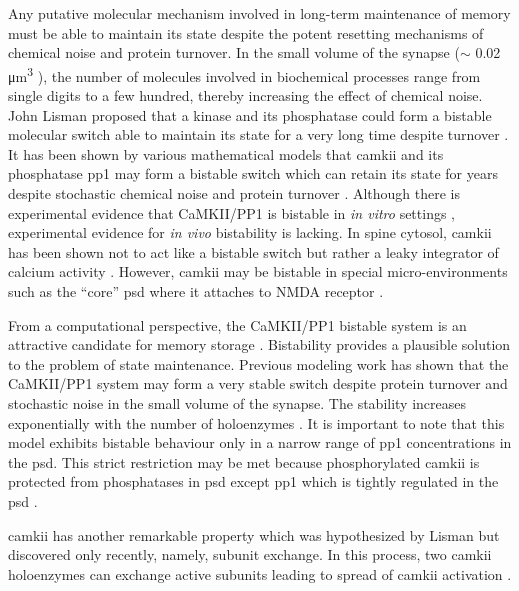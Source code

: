 \documentclass[9pt,lineno,doublespacing]{elife}
\begin{document}
Any putative molecular mechanism involved in long-term maintenance of memory
must be able to maintain its state despite the potent resetting mechanisms of
chemical noise and protein turnover. In the small volume of the synapse ($\sim$
0.02 \si{\micro\meter^3} \citep{bartol_nanoconnectomic_2015}), the number of
molecules involved in biochemical processes range from single digits to a few
hundred, thereby increasing the effect of chemical noise. John Lisman proposed that
a kinase and its phosphatase could form a bistable molecular switch able to
maintain its state for a very long time despite turnover
\citep{lisman_mechanism_1985}. It has been shown by various mathematical models
that \gls{camkii} and its phosphatase \gls{pp1} may form a bistable switch
\citep{zhabotinsky_bistability_2000} which can retain its state for years
despite stochastic chemical noise and protein turnover
\citep{miller_stability_2005}. Although there is experimental evidence that
CaMKII/PP1 is bistable in \emph{in vitro} settings
\citep{bradshaw_ultrasensitive_2003,urakubo_vitro_2014}, experimental evidence
for \emph{in vivo} bistability is lacking. In spine cytosol, \gls{camkii} has
been shown not to act like a bistable switch but rather a leaky integrator of
calcium activity \citep{chang_camkii_2017}. However, \gls{camkii} may be
bistable in special micro-environments such as the ``core'' \gls{psd} where it
attaches to NMDA receptor \citep{dosemeci_postsynaptic_2016,
petersen_distribution_2003}.

From a computational perspective, the CaMKII/PP1 bistable system is an attractive
candidate for memory storage \citep{koch_biophysics_2004}. Bistability provides
a plausible solution to the problem of state maintenance. Previous modeling work
has shown that the CaMKII/PP1 system may form a very stable switch despite protein 
turnover and stochastic noise in the small volume of the synapse. The stability
increases exponentially with the number of holoenzymes
\citep{miller_stability_2005}. It is important to note that this model exhibits
bistable behaviour only in a narrow range of \gls{pp1} concentrations in the
\gls{psd}. This strict restriction may be met because phosphorylated
\gls{camkii} is protected from phosphatases in \gls{psd} except \gls{pp1}
\citep{strack_differential_1997} which is tightly regulated in the \gls{psd}
\citep{bollen_extended_2010}. 

\gls{camkii} has another remarkable property which was hypothesized by Lisman
\citep{lisman_cam_1994} but discovered only recently, namely, subunit exchange.
In this process, two \gls{camkii} holoenzymes can exchange active subunits
leading to spread of \gls{camkii} activation \citep{stratton_activation-triggered_2014}.
\end{document}
